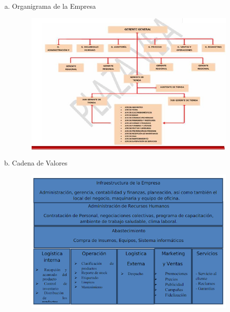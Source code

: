 \begin{enumerate}[a)]
        \item Organigrama de la Empresa

			\begin{figure}[htb]
				\begin{center}
					\includegraphics[width=15cm]{./Imagenes/5}
				\end{center}
			\end{figure}
        \item Cadena de Valores

			\begin{figure}[htb]
				\begin{center}
					\includegraphics[width=15cm]{./Imagenes/6}
				\end{center}
			\end{figure}


\end{enumerate}
